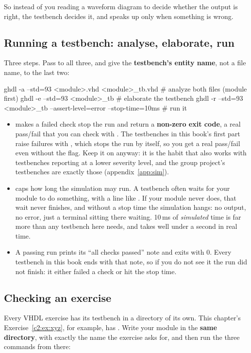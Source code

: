 So instead of you reading a waveform diagram to decide whether the output is right, the testbench
decides it, and speaks up only when something is wrong.

\subsection{Running a testbench: analyse, elaborate, run}
\label{c2:sub:run}
Three steps. Pass  to all three, and give the \textbf{testbench's entity name}, not
a file name, to the last two:

\begin{shell}
ghdl -a --std=93 <module>.vhd <module>_tb.vhd        # analyze both files (module first)
ghdl -e --std=93 <module>_tb                         # elaborate the testbench
ghdl -r --std=93 <module>_tb --assert-level=error --stop-time=10ms   # run it
\end{shell}

\begin{itemize}
  \item {} makes a failed check stop the run and return a
    \textbf{non-zero exit code}, a real pass/fail that you can check with . The
    testbenches in this book's first part raise failures with , which stops
    the run by itself, so you get a real pass/fail even without the flag. Keep it on anyway: it is
    the habit that also works with testbenches reporting at a lower severity level, and the group
    project's testbenches are exactly those (appendix~\ref{app:sim}).
  \item {} caps how long the simulation may run. A testbench often waits for
    your module to do something, with a line like . If your module never
    does, that wait never finishes, and without a stop time the simulation hangs: no output, no
    error, just a terminal sitting there waiting. 10\,ms of \emph{simulated} time is far more than
    any testbench here needs, and takes well under a second in real time.
  \item A passing run prints its ``all checks passed'' note and exits with 0. Every testbench in
    this book ends with that note, so if you do not see it the run did not finish: it either failed
    a check or hit the stop time.
\end{itemize}

\subsection{Checking an exercise}
\label{c2:sub:exercise}
Every VHDL exercise has its testbench in a directory of its own. This chapter's
Exercise~\ref{c2:ex:xyz}, for example, has
. Write your module in the \textbf{same
directory}, with exactly the name the exercise asks for, and then run the three commands from
there:

